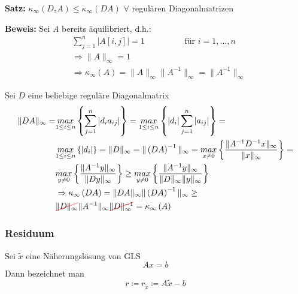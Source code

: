 \textbf{Satz:}
$\kappa_\infty\left(D_zA\right) \leq \kappa_\infty\left(DA\right)$ \hspace{2cm} $\forall$ regulären Diagonalmatrizen

\textbf{Beweis:}
Sei $A$ bereits äquilibriert, d.h.:
\begin{align*}
    &\sum\limits_{j=1}^{n}{\left|A\left[i,j\right]\right|} = 1 \hspace{2cm} \text{für } i = 1, \dots, n \\
	  &\Rightarrow \|A\|_\infty = 1 \\
	  &\Rightarrow \kappa_\infty\left(A\right) = \|A\|_\infty \|A^{-1}\|_\infty = \|A^{-1}\|_\infty
\end{align*}

Sei $D$ eine beliebige reguläre Diagonalmatrix
\begin{equation*}
\begin{aligned}
  \|DA\|_\infty = &\underset{1 \leq i \leq n}{max} \left\{\sum\limits_{j=1}^{n}{\left|d_ia_{ij}\right|}\right\} =
  \underset{1 \leq i \leq n}{max}\left\{\left|d_i\right|\sum\limits_{j=1}^{n}{\left|a_{ij}\right|}\right\} = \\
  &\underset{1 \leq i \leq n}{max}\left\{\left|d_i\right|\right\} = \|D\|_\infty = 
  \|\left(DA\right)^{-1}\|_\infty = \underset{x \neq 0}{max}\left\{\frac{\|A^{-1}D^{-1}x\|_\infty}{\|x\|_\infty}\right\} = \\
  &\underset{y \neq 0}{max}\left\{\frac{\|A^{-1}y\|_\infty}{\|Dy\|_\infty}\right\} \geq \underset{y \neq 0}{max}\left\{\frac{\|A^{-1}y\|_\infty}{\|D\|_\infty\|y\|_\infty}   \right\} \\
  &\Rightarrow \kappa_\infty\left(DA\right) = \|DA\|_\infty \|\left(DA\right)^{-1}\|_\infty \geq \\
  &\hcancel{$\|D\|_\infty$} \|A^{-1}\|_\infty \hcancel{$\|D\|_{\infty}^{-1}$} = \kappa_\infty\left(A\right)
\end{aligned}
\end{equation*}

\subsubsection{Residuum}
Sei $\widetilde
{x}$ eine Näherungslösung von GLS
\begin{equation*}
Ax=b
\end{equation*}
Dann bezeichnet man
\begin{equation*}
r \coloneqq r_{\widetilde{x}} \coloneqq A\widetilde{x} - b
\end{equation*}

